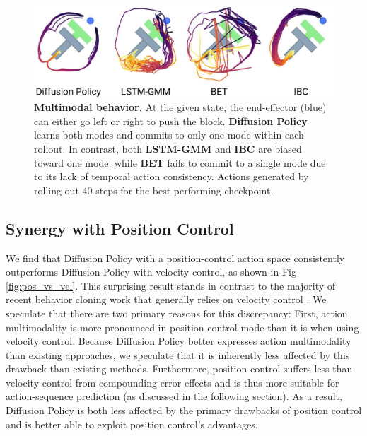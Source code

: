 \documentclass[Afour,sageh,times]{sagej}
\begin{document}
\begin{figure}[h]
\centering
\includegraphics[width=0.98\linewidth]{figure/multimodal_sim.pdf} %

\caption{\label{fig:multimodal}
\textbf{Multimodal behavior.} At the given state, the end-effector (blue) can either go left or right to push the block.
\textbf{Diffusion Policy} learns both modes and commits to only one mode within each rollout.
In contrast, both \textbf{LSTM-GMM} \cite{robomimic} and \textbf{IBC} \cite{ibc} are biased toward one mode, while \textbf{BET} \cite{bet} fails to commit to a single mode due to its lack of temporal action consistency.
Actions generated by rolling out 40 steps for the best-performing checkpoint.
}
\vspace{-2mm}
\end{figure}
\subsection{Synergy with Position Control}
\label{sec:property_pos_vs_vel}
We find that Diffusion Policy with a position-control action space consistently outperforms Diffusion Policy with velocity control, as shown in Fig \ref{fig:pos_vs_vel}. This surprising result stands in contrast to the majority of recent behavior cloning work that generally relies on velocity control \cite{robomimic, bet, zhang2018deep, florence2019self, mandlekar2020learning, mandlekar2020iris}. We speculate that there are two primary reasons for this discrepancy: First, action multimodality is more pronounced in position-control mode than it is when using velocity control. Because Diffusion Policy better expresses action multimodality than existing approaches, we speculate that it is inherently less affected by this drawback than existing methods. Furthermore, position control suffers less than velocity control from compounding error effects and is thus more suitable for action-sequence prediction (as discussed in the following section). As a result, Diffusion Policy is both less affected by the primary drawbacks of position control and is better able to exploit position control's advantages.
\end{document}
